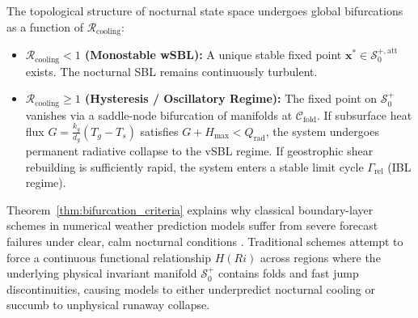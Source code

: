 \begin{theorem}
\label{thm:bifurcation_criteria}
The topological structure of nocturnal state space undergoes global bifurcations as a function of $\mathcal{R}_{\mathrm{cooling}}$:
\begin{itemize}
    \item \textbf{$\mathcal{R}_{\mathrm{cooling}} < 1$ (Monostable wSBL):} A unique stable fixed point $\mathbf{x}^* \in \mathcal{S}_0^{+,\mathrm{att}}$ exists. The nocturnal SBL remains continuously turbulent.
    \item \textbf{$\mathcal{R}_{\mathrm{cooling}} \ge 1$ (Hysteresis / Oscillatory Regime):} The fixed point on $\mathcal{S}_0^+$ vanishes via a saddle-node bifurcation of manifolds at $\mathcal{C}_{\mathrm{fold}}$. If subsurface heat flux $G = \frac{k_g}{d_g}(T_g - T_s)$ satisfies $G + H_{\max} < Q_{\mathrm{rad}}$, the system undergoes permanent radiative collapse to the vSBL regime. If geostrophic shear rebuilding is sufficiently rapid, the system enters a stable limit cycle $\Gamma_{\mathrm{rel}}$ (IBL regime).
\end{itemize}
\end{theorem}

Theorem~\ref{thm:bifurcation_criteria} explains why classical boundary-layer schemes in numerical weather prediction models suffer from severe forecast failures under clear, calm nocturnal conditions \citep{Holtslag2013}. Traditional schemes attempt to force a continuous functional relationship $H(Ri)$ across regions where the underlying physical invariant manifold $\mathcal{S}_0^+$ contains folds and fast jump discontinuities, causing models to either underpredict nocturnal cooling or succumb to unphysical runaway collapse.
